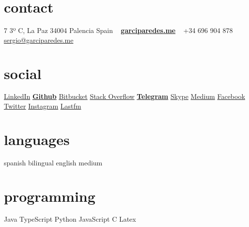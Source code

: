\documentclass[]{friggeri-cv} %
\begin{document}


    \begin{aside} %

        \section{contact}
            7 3º C, La Paz
            34004 Palencia
            Spain
            ~
            \href{http://garciparedes.me}{\textbf{garciparedes.me}}
            ~
            +34 696 904 878
            \href{mailto:sergio@garciparedes.me}{sergio@garciparedes.me}
        \section{social}
            \href{https://es.linkedin.com/in/garciparedes/en}{LinkedIn\quad\faLinkedin }
            \href{https://github.com/garciparedes}{\textbf{Github}\quad\faGithub }
            \href{https://bitbucket.org/garciparedes/}{Bitbucket\quad\faBitbucket }
            \href{http://stackoverflow.com/users/3921457/garciparedes}{Stack Overflow\quad\faStackOverflow }
            \href{https://telegram.me/garciparedes}{\textbf{Telegram}\quad\faPaperPlane }
            \href{skype:garciparedes?call}{Skype\quad\faSkype }
            \href{https://medium.com/@garciparedes}{Medium\quad\faMedium }
            \href{https://facebook.com/garciparedes}{Facebook\quad\faFacebook}
            \href{https://twitter.com/garciparedes}{Twitter\quad\faTwitter }
            \href{https://www.instagram.com/garciparedes/}{Instagram\quad\faInstagram }
            \href{http://www.last.fm/user/garciparedes/}{Lastfm\quad\faLastfm}
        \section{languages}
            spanish bilingual
            english medium
        \section{programming}
            Java\quad{\color{red} $\varheartsuit\varheartsuit\varheartsuit\varheartsuit\varheartsuit\varheartsuit$}{\color{black} $ $}
            TypeScript\quad{\color{red} $\varheartsuit\varheartsuit\varheartsuit\varheartsuit\varheartsuit$}{\color{black} $\varheartsuit$}
            Python\quad{\color{red} $\varheartsuit\varheartsuit\varheartsuit$}{\color{black} $\varheartsuit\varheartsuit\varheartsuit$}
            JavaScript\quad{\color{red} $\varheartsuit\varheartsuit\varheartsuit$}{\color{black} $\varheartsuit\varheartsuit\varheartsuit$}
            C\quad{\color{red} $\varheartsuit\varheartsuit$}{\color{black} $\varheartsuit\varheartsuit\varheartsuit\varheartsuit$}
            Latex\quad{\color{red} $\varheartsuit\varheartsuit\varheartsuit\varheartsuit$}{\color{black} $\varheartsuit\varheartsuit$}

\end{aside}
\end{document}
